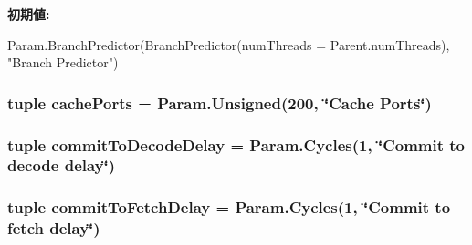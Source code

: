 \label{classO3CPU_1_1DerivO3CPU_ac566dd90d96e45183abc6f54c960ffec}
{\bfseries 初期値:}
\begin{DoxyCode}
Param.BranchPredictor(BranchPredictor(numThreads =
                                                       Parent.numThreads),
                                       "Branch Predictor")
\end{DoxyCode}
\hypertarget{classO3CPU_1_1DerivO3CPU_a351bb34b2113c3ae4bd2449d92794d5a}{
\subsubsection[{cachePorts}]{\setlength{\rightskip}{0pt plus 5cm}tuple {\bf cachePorts} = Param.Unsigned(200, \char`\"{}Cache Ports\char`\"{})}}
\label{classO3CPU_1_1DerivO3CPU_a351bb34b2113c3ae4bd2449d92794d5a}
\hypertarget{classO3CPU_1_1DerivO3CPU_ad4f09c6c6f92935f2d917a5b0ba77cb0}{
\subsubsection[{checker}]{}}
\label{classO3CPU_1_1DerivO3CPU_ad4f09c6c6f92935f2d917a5b0ba77cb0}
\hypertarget{classO3CPU_1_1DerivO3CPU_acaab18e678264ee264642b5be0d91157}{
\subsubsection[{commitToDecodeDelay}]{\setlength{\rightskip}{0pt plus 5cm}tuple {\bf commitToDecodeDelay} = Param.Cycles(1, \char`\"{}Commit to decode delay\char`\"{})}}
\label{classO3CPU_1_1DerivO3CPU_acaab18e678264ee264642b5be0d91157}
\hypertarget{classO3CPU_1_1DerivO3CPU_aad1963f659c6e9595b5d1ff499e843d8}{
\subsubsection[{commitToFetchDelay}]{\setlength{\rightskip}{0pt plus 5cm}tuple {\bf commitToFetchDelay} = Param.Cycles(1, \char`\"{}Commit to fetch delay\char`\"{})}}
